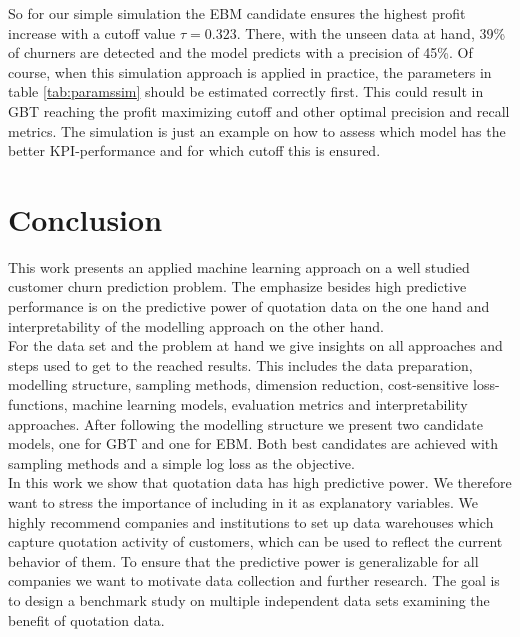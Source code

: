 \documentclass[12pt,titlepage]{article}
\begin{document}
\noindent
So for our simple simulation the EBM candidate ensures the highest profit increase with a cutoff value $\tau=0.323$. There, with the unseen data at hand, 39\% of churners are detected and the model predicts with a precision of 45\%. Of course, when this simulation approach is applied in practice, the parameters in table \ref{tab:paramssim} should be estimated correctly first. This could result in GBT reaching the profit maximizing cutoff and other optimal precision and recall metrics. The simulation is just an example on how to assess which model has the better KPI-performance and for which cutoff this is ensured. \\

\section{Conclusion} \par

This work presents an applied machine learning approach on a well studied customer churn prediction problem. The emphasize besides high predictive performance is on the predictive power of quotation data on the one hand and interpretability of the modelling approach on the other hand. \\
For the data set and the problem at hand we give insights on all approaches and steps used to get to the reached results. This includes the data preparation, modelling structure, sampling methods, dimension reduction, cost-sensitive loss-functions, machine learning models, evaluation metrics and interpretability approaches. After following the modelling structure we present two candidate models, one for GBT and one for EBM. Both best candidates are achieved with sampling methods and a simple log loss as the objective. \\
In this work we show that quotation data has high predictive power. We therefore want to stress the importance of including in it as explanatory variables. We highly recommend companies and institutions to set up data warehouses which capture quotation activity of customers, which can be used to reflect the current behavior of them. To ensure that the predictive power is generalizable for all companies we want to motivate data collection and further research. The goal is to design a benchmark study on multiple independent data sets examining the benefit of quotation data. \\
\end{document}
